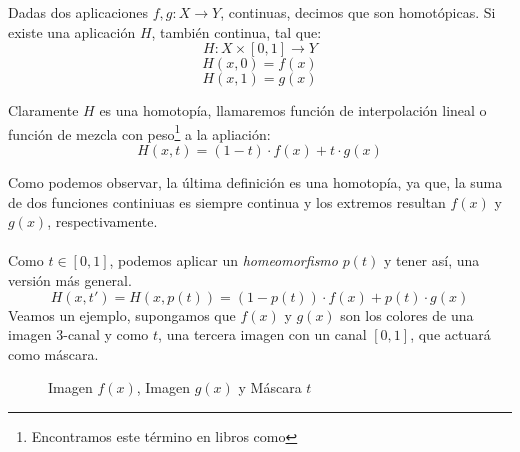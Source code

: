 \begin{definition}
    Dadas dos aplicaciones \(f, g:X\longrightarrow Y\), continuas, decimos que son homotópicas. Si existe una aplicación \(H\), también continua, tal que:
    \[ H:X\times[0,1]\longrightarrow Y \]
    \[ H(x, 0)=f(x) \]
    \[ H(x, 1)=g(x) \]
\end{definition}
\begin{definition}
    Claramente \(H\) es una homotopía, llamaremos función de interpolación lineal o función de mezcla con peso\label{def:mix}\footnote{Encontramos este término en libros como} a la apliación:
    \[H(x, t)=(1-t)\cdot f(x) + t\cdot g(x)\]
\end{definition}
Como podemos observar,  la última definición es una homotopía, ya que, la suma de dos funciones continiuas es siempre continua y los extremos resultan \(f(x)\) y \(g(x)\), respectivamente.\\\\
Como \(t\in[0,1]\), podemos aplicar un \textit{homeomorfismo} \(p(t)\) y tener así, una versión más general.
    \[H(x, t')=H(x, p(t))=(1-p(t))\cdot f(x) + p(t)\cdot g(x)\]
Veamos un ejemplo, supongamos que \(f(x)\) y \(g(x)\) son los colores de una imagen 3-canal y como \(t\), una tercera imagen con un canal \([0,1]\), que actuará como máscara.
\begin{figure}[H]
  \centering
  \captionsetup{justification=centering}%
  \hfill
  \hfill
  \caption{Imagen \(f(x)\), Imagen \(g(x)\) y Máscara \(t\)}
  \label{fig:textures}
\end{figure}

